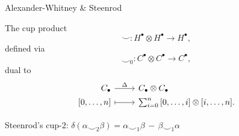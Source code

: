 \documentclass[10pt,t, handout]{beamer} %
\begin{document}
\begin{frame}{Alexander-Whitney \& Steenrod}


	\vskip -5pt
	The cup product
	\begin{equation*}
	\smallsmile \colon H^\bullet \otimes H^\bullet \to H^\bullet,
	\end{equation*}
	\vskip -9pt
	defined via
	\vskip -9pt
	\begin{equation*}
	\smallsmile_0 \colon C^\bullet \otimes C^\bullet \to C^\bullet,
	\end{equation*}
	dual to
	\begin{equation*}
	\begin{tikzcd}[
	,row sep = 0ex
	,/tikz/column 1/.append style={anchor=base east}
	,/tikz/column 2/.append style={anchor=base west}
	]
	C_\bullet \arrow[r, "\Delta"] & C_\bullet \otimes C_\bullet \\
	{[0, \dots, n]} \arrow[r, |->] & \sum_{i=0}^{n} {[0, \dots, i] \otimes [i, \dots, n]}.
	\end{tikzcd}
	\end{equation*}

	\vskip 15pt

	\textcolor{pblue}{Steenrod's cup-$2$:} \quad
	$\delta(\alpha \smallsmile_2 \beta) = \alpha \smallsmile_1 \beta\, -\, \beta \smallsmile_1 \alpha$
\end{frame}
\end{document}
